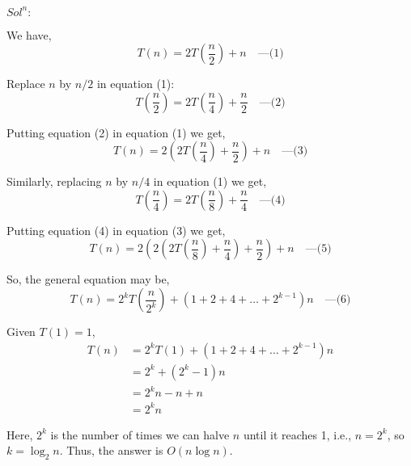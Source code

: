\documentclass{article}
\begin{document}
$Sol^n:$

We have,
\begin{equation}
    T(n) = 2T\left(\frac{n}{2}\right) + n \quad \text{---(1)}
\end{equation}

Replace \( n \) by \( n/2 \) in equation (1):
\begin{equation}
    T\left(\frac{n}{2}\right) = 2T\left(\frac{n}{4}\right) + \frac{n}{2} \quad \text{---(2)}
\end{equation}

Putting equation (2) in equation (1) we get,
\begin{equation}
    T(n) = 2\left(2T\left(\frac{n}{4}\right) + \frac{n}{2}\right) + n \quad \text{---(3)}
\end{equation}

Similarly, replacing \( n \) by \( n/4 \) in equation (1) we get,
\begin{equation}
    T\left(\frac{n}{4}\right) = 2T\left(\frac{n}{8}\right) + \frac{n}{4} \quad \text{---(4)}
\end{equation}

Putting equation (4) in equation (3) we get,
\begin{equation}
    T(n) = 2\left(2\left(2T\left(\frac{n}{8}\right) + \frac{n}{4}\right) + \frac{n}{2}\right) + n \quad \text{---(5)}
\end{equation}

So, the general equation may be,
\begin{equation}
    T(n) = 2^kT\left(\frac{n}{2^k}\right) + \left(1 + 2 + 4 + \ldots + 2^{k-1}\right)n \quad \text{---(6)}
\end{equation}

Given \( T(1) = 1 \),
\begin{align*}
    T(n) & = 2^kT(1) + \left(1 + 2 + 4 + \ldots + 2^{k-1}\right)n \\
         & = 2^k + (2^k - 1)n \\
         & = 2^kn - n + n \\
         & = 2^kn
\end{align*}

Here, \( 2^k \) is the number of times we can halve \( n \) until it reaches 1, i.e., \( n = 2^k \), so \( k = \log_2 n \). Thus, the answer is \( O(n \log n) \).
\end{document}
